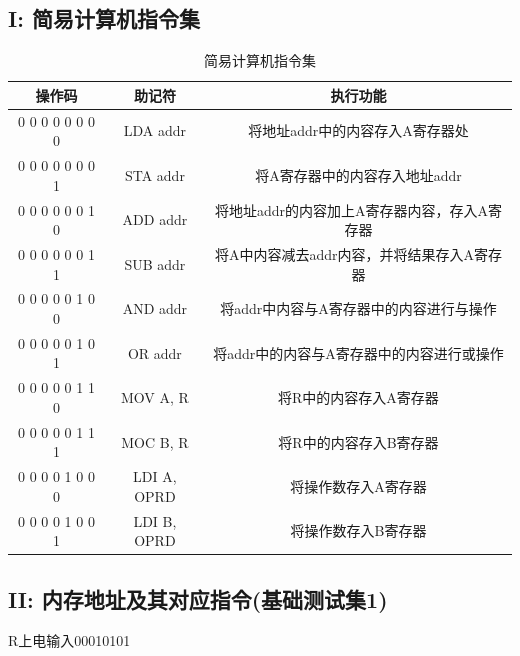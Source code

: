 \documentclass[UTF8]{ctexart}
\begin{document}
    \subsection{I: 简易计算机指令集}
    \begin{table}[!htb]
      \centering
      \begin{tabular}{|c|c|c|}
        \hline
        操作码 & 助记符 & 执行功能 \\
        \hline
        0 0 0 0 0 0 0 0 & LDA addr & 将地址addr中的内容存入A寄存器处 \\
        0 0 0 0 0 0 0 1 & STA addr & 将A寄存器中的内容存入地址addr \\
        \hline
        0 0 0 0 0 0 1 0 & ADD addr & 将地址addr的内容加上A寄存器内容，存入A寄存器 \\
        0 0 0 0 0 0 1 1 & SUB addr & 将A中内容减去addr内容，并将结果存入A寄存器 \\
        \hline
        0 0 0 0 0 1 0 0 & AND addr & 将addr中内容与A寄存器中的内容进行与操作 \\
        0 0 0 0 0 1 0 1 & OR addr & 将addr中的内容与A寄存器中的内容进行或操作 \\
        \hline
        0 0 0 0 0 1 1 0 & MOV A, R & 将R中的内容存入A寄存器 \\
        0 0 0 0 0 1 1 1 & MOC B, R & 将R中的内容存入B寄存器 \\
        \hline
        0 0 0 0 1 0 0 0 & LDI A, OPRD & 将操作数存入A寄存器\\
        0 0 0 0 1 0 0 1 & LDI B, OPRD & 将操作数存入B寄存器\\
        \hline
      \end{tabular}
      \caption{简易计算机指令集}\label{简易计算机指令集}
    \end{table}
    \newpage

    \subsection{II: 内存地址及其对应指令(基础测试集1)}
    R上电输入00010101
\end{document}
